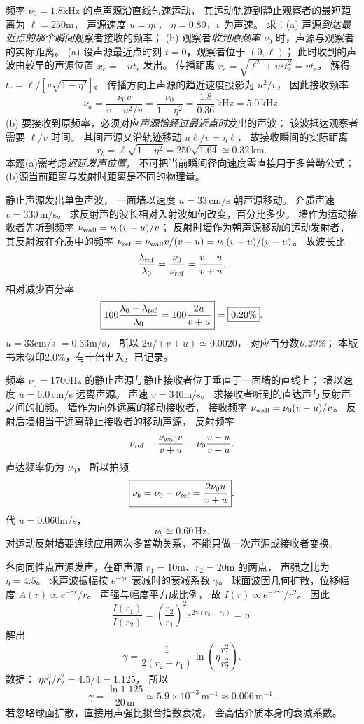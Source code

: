 频率 $\nu_0=1.8$kHz 的点声源沿直线匀速运动，
其运动轨迹到静止观察者的最短距离为
$\ell=250$m，
声源速度 $u=\eta v$，
$\eta=0.80$，$v$ 为声速。
求：(a) 声源\emph{到达最近点的那个瞬间}观察者接收的频率；
(b) 观察者\emph{收到原频率} $\nu_0$ 时，声源与观察者的实际距离。
\exsolution
(a) 设声源最近点时刻 $t=0$，观察者位于 $(0,\ell)$；
此时收到的声波由较早的声源位置
$x_e=-ut_r$ 发出。
传播距离
$r_e=\sqrt{\ell^2+u^2t_r^2}=vt_r$，
解得
$t_r=\ell/[v\sqrt{1-\eta^2}]$。
传播方向上声源的趋近速度投影为
$u^2/v$，
因此接收频率
\[
\boxed{\nu_a=\frac{\nu_0v}{v-u^2/v}
=\frac{\nu_0}{1-\eta^2}
=\frac{1.8}{0.36}\,\mathrm{kHz}
=5.0\,\mathrm{kHz}}.
\]
(b) 要接收到原频率，必须对应\emph{声源恰经过最近点时}发出的声波；
该波抵达观察者需要 $\ell/v$ 时间。
其间声源又沿轨迹移动
$u\ell/v=\eta\ell$，
故接收瞬间的实际距离
\[
\boxed{r_b=\ell\sqrt{1+\eta^2}
=250\sqrt{1.64}\simeq0.32\,\mathrm{km}}.
\]
\excheck 本题(a)需考虑\emph{迟延发声位置}，
不可把当前瞬间径向速度零直接用于多普勒公式；
(b)源当前距离与发射时距离是不同的物理量。

静止声源发出单色声波，
一面墙以速度
$u=33\,\mathrm{cm/s}$ 朝声源移动。
介质声速
$v=330\,\mathrm{m/s}$。
求反射声的波长相对入射波如何改变，百分比多少。
\exsolution
墙作为运动接收者先听到频率
$\nu_{\rm wall}=\nu_0(v+u)/v$；
反射时墙作为朝声源移动的运动发射者，
其反射波在介质中的频率
$\nu_{\rm ref}=\nu_{\rm wall}v/(v-u)
=\nu_0(v+u)/(v-u)$。
故波长比
\[
\frac{\lambda_{\rm ref}}{\lambda_0}
=\frac{\nu_0}{\nu_{\rm ref}}
=\frac{v-u}{v+u}.
\]
相对减少百分率
\[
\boxed{100\frac{\lambda_0-\lambda_{\rm ref}}
{\lambda_0}=100\frac{2u}{v+u}}
=\boxed{0.20\%}.
\]
\excheck $u=33$cm/s $=0.33$m/s，
所以 $2u/(v+u)\simeq0.0020$，
对应百分数\emph{0.20\%}；
本版书末似印2.0\%，有十倍出入，已记录。

频率 $\nu_0=1700$Hz 的静止声源与静止接收者位于垂直于一面墙的直线上；
墙以速度
$u=6.0\,\mathrm{cm/s}$ 远离声源。
声速 $v=340$m/s。
求接收者听到的直达声与反射声之间的拍频。
\exsolution
墙作为向外远离的移动接收者，
接收频率
$\nu_{\rm wall}=\nu_0(v-u)/v$。
反射后墙相当于远离静止接收者的移动声源，
反射频率
\[
\nu_{\rm ref}=\frac{\nu_{\rm wall}v}{v+u}
=\nu_0\frac{v-u}{v+u}.
\]
直达频率仍为 $\nu_0$，
所以拍频
\[
\boxed{\nu_b=\nu_0-\nu_{\rm ref}
=\frac{2\nu_0u}{v+u}}.
\]
代 $u=0.060$m/s，
\[
\boxed{\nu_b\simeq0.60\,\mathrm{Hz}}.
\]
\excheck 对运动反射墙要连续应用两次多普勒关系，不能只做一次声源或接收者变换。

各向同性点声源发声，在距声源
$r_1=10$m、$r_2=20$m 的两点，
声强之比为
$\eta=4.5$。
求声波振幅按
$e^{-\gamma r}$ 衰减时的衰减系数 $\gamma$。
\exsolution
球面波因几何扩散，位移幅度
$A(r)\propto e^{-\gamma r}/r$。
声强与幅度平方成比例，
故
$I(r)\propto e^{-2\gamma r}/r^2$。
因此
\[
\frac{I(r_1)}{I(r_2)}
=\left(\frac{r_2}{r_1}\right)^2
e^{2\gamma(r_2-r_1)}
=\eta.
\]
解出
\[
\boxed{\gamma=\frac1{2(r_2-r_1)}
\ln\left(\eta\frac{r_1^2}{r_2^2}\right)}.
\]
数据：
$\eta r_1^2/r_2^2=4.5/4=1.125$，
所以
\[
\boxed{\gamma=\frac{\ln1.125}{20\,\mathrm m}
\simeq5.9\times10^{-3}\,\mathrm{m^{-1}}
\approx0.006\,\mathrm{m^{-1}}}.
\]
\excheck 若忽略球面扩散，直接用声强比拟合指数衰减，
会高估介质本身的衰减系数。

